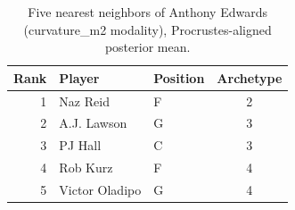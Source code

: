 \begin{table}[htbp]
  \centering\small
  \begin{tabular}{rllc}
    \toprule
    Rank & Player & Position & Archetype \\
    \midrule
    1 & Naz Reid & F & 2 \\
    2 & A.J. Lawson & G & 3 \\
    3 & PJ Hall & C & 3 \\
    4 & Rob Kurz & F & 4 \\
    5 & Victor Oladipo & G & 4 \\
    \bottomrule
  \end{tabular}
  \caption{Five nearest neighbors of Anthony Edwards (curvature_m2 modality), Procrustes-aligned posterior mean.}
  \label{tab:Anthony_Edwards_neighbors_curvature_m2}
\end{table}

